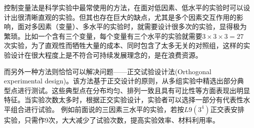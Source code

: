 控制变量法是科学实验中最常使用的方法，在面对低因素、低水平的实验时可以设计出很清晰直观的实验。但其也存在巨大的缺点，尤其是多个因素交互作用的影响，面对多因素（变量）、多水平的实验时，就需要设计很多次的实验，显得极为繁琐。比如一个含有三个变量，每个变量有三个水平的实验就需要$ 3\times 3 \times 3=27$次实验，为了直观性而牺牲大量的成本、同时包含了太多无关的对照组，这样的实验设计在很大程度上是不符合可持续发展理念的，是在浪费资源。

而另外一种方法则恰恰可以解决问题——正交试验设计法(Orthogonal experimental design)。该方法基于正交设计的原则，从多组实验中精选出部分典型点进行测试。这些典型点在分布均匀、排列一致且具有可比性等方面表现出明显特征\cite{wangxueshen}。当实验次数太多时，根据正交实验设计，实验者可以选择一部分有代表性水平组合进行试验。 例如前面说的三因素三水平的实验，若按$ L9(3^4) $正交表安排实验，只需作9次，大大减少了试验次数，提高实验效率、材料利用率。


